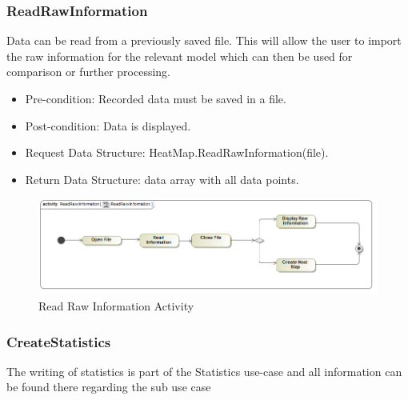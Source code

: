 	\subsubsection{ReadRawInformation}
Data can be read from a previously saved file. This will allow the user to import the raw information for the relevant model which can then be used for comparison or further processing.
\begin{itemize}
\item Pre-condition: Recorded data must be saved in a file.
\item Post-condition: Data is displayed.
\item Request Data Structure: HeatMap.ReadRawInformation(file).
\item Return Data Structure: data array with all data points.
\end{itemize}

\begin{figure}[!ht]
	\centering
	\includegraphics[scale=0.5]{Diagrams/Activity_Diagram__ReadRawInformation__ReadRawInformation.png}
	\caption{Read Raw Information Activity}
\end{figure}
	
	\subsubsection{CreateStatistics}
The writing of statistics is part of the Statistics use-case and all information can be found there regarding the sub use case

	
	
